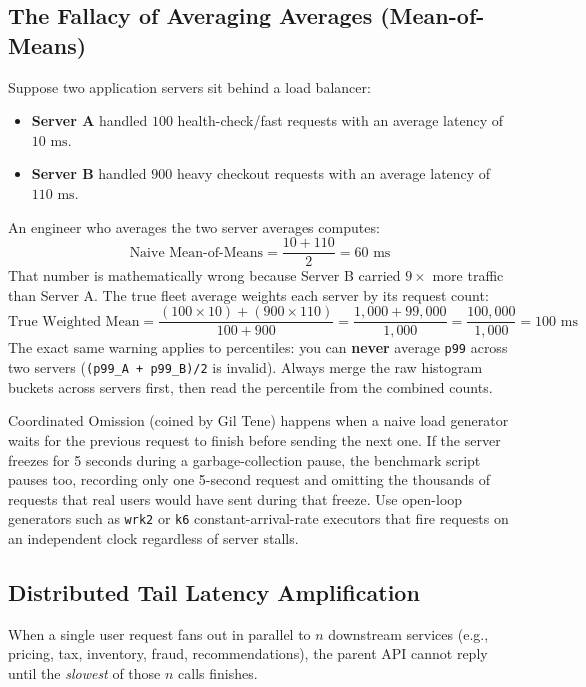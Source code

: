 \subsection{The Fallacy of Averaging Averages (Mean-of-Means)}

Suppose two application servers sit behind a load balancer:
\begin{itemize}[leftmargin=18pt]
  \item \textbf{Server A} handled $100$ health-check/fast requests with an average latency of $10\text{ ms}$.
  \item \textbf{Server B} handled $900$ heavy checkout requests with an average latency of $110\text{ ms}$.
\end{itemize}
An engineer who averages the two server averages computes:
$$\text{Naive Mean-of-Means} = \frac{10 + 110}{2} = 60\text{ ms}$$
That number is mathematically wrong because Server B carried $9\times$ more traffic than Server A. The true fleet average weights each server by its request count:
$$\text{True Weighted Mean} = \frac{(100 \times 10) + (900 \times 110)}{100 + 900} = \frac{1,000 + 99,000}{1,000} = \frac{100,000}{1,000} = 100\text{ ms}$$
The exact same warning applies to percentiles: you can \textbf{never} average \texttt{p99} across two servers (\texttt{(p99\_A + p99\_B)/2} is invalid). Always merge the raw histogram buckets across servers first, then read the percentile from the combined counts.

\begin{commonmistakebox}
Coordinated Omission (coined by Gil Tene) happens when a naive load generator waits for the previous request to finish before sending the next one. If the server freezes for 5 seconds during a garbage-collection pause, the benchmark script pauses too, recording only one 5-second request and omitting the thousands of requests that real users would have sent during that freeze. Use open-loop generators such as \texttt{wrk2} or \texttt{k6} constant-arrival-rate executors that fire requests on an independent clock regardless of server stalls.
\end{commonmistakebox}

\subsection{Distributed Tail Latency Amplification}

When a single user request fans out in parallel to $n$ downstream services (e.g., pricing, tax, inventory, fraud, recommendations), the parent API cannot reply until the \emph{slowest} of those $n$ calls finishes.

